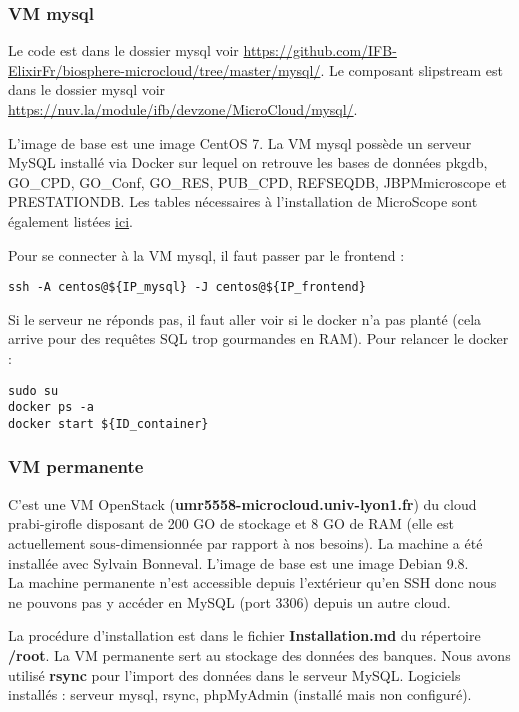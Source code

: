 \subsubsection {VM mysql}

\label{mysql}
Le code est dans le dossier mysql voir \url{https://github.com/IFB-ElixirFr/biosphere-microcloud/tree/master/mysql/}.
Le composant slipstream est dans le dossier mysql voir \url{https://nuv.la/module/ifb/devzone/MicroCloud/mysql/}.

L'image de base est une image CentOS 7.
La VM mysql possède un serveur MySQL installé via Docker sur lequel on retrouve les bases de données pkgdb, GO\_CPD, GO\_Conf, GO\_RES, PUB\_CPD, REFSEQDB, JBPMmicroscope et PRESTATIONDB.
\newline
Les tables nécessaires à l'installation de MicroScope sont également listées \href{https://intranet.genoscope.cns.fr/agc/redmine/projects/microcloud/wiki/Tables_necessaires_a_installation}{ici}.
\newline

Pour se connecter à la VM mysql, il faut passer par le frontend :
\begin{lstlisting}[style=bash]
ssh -A centos@${IP_mysql} -J centos@${IP_frontend}
\end{lstlisting}
\bigskip

Si le serveur ne réponds pas, il faut aller voir si le docker n'a pas planté (cela arrive pour des requêtes SQL trop gourmandes en RAM). Pour relancer le docker :
\begin{lstlisting}[style=bash]
sudo su
docker ps -a
docker start ${ID_container}
\end{lstlisting}

\subsubsection {VM permanente}

\label{VMpermanente} C'est une VM OpenStack (\textbf{umr5558-microcloud.univ-lyon1.fr}) du cloud prabi-girofle disposant de 200 GO de stockage et 8 GO de RAM (elle est actuellement sous-dimensionnée par rapport à nos besoins). La machine a été installée avec Sylvain Bonneval. L'image de base est une image Debian 9.8.\\
La machine permanente n'est accessible depuis l'extérieur qu'en SSH donc nous ne pouvons pas y accéder en MySQL (port 3306) depuis un autre cloud.
\newline

La procédure d'installation est dans le fichier \textbf{Installation.md} du répertoire \textbf{/root}. La VM permanente sert au stockage des données des banques. Nous avons utilisé \textbf{rsync} pour l'import des données dans le serveur MySQL.
\newline
Logiciels installés : serveur mysql, rsync, phpMyAdmin (installé mais non configuré). 
\newline

